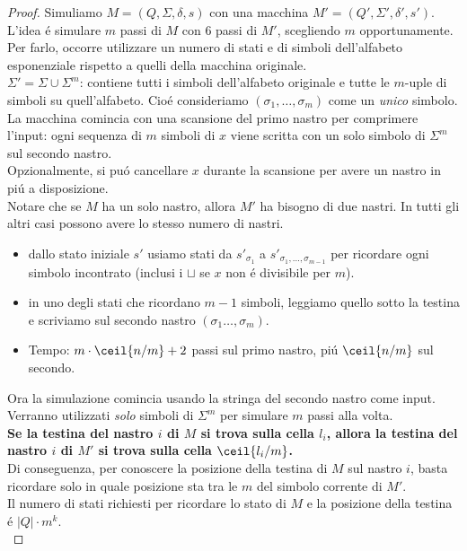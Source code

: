 \begin{proof}
Simuliamo $M=(Q, \Sigma, \delta, s)$ con una macchina $M'=(Q', \Sigma', \delta', s')$. \\
L'idea é simulare $m$ passi di $M$ con $6$ passi di $M'$, scegliendo $m$ opportunamente. \\
Per farlo, occorre utilizzare un numero di stati e di simboli dell'alfabeto esponenziale rispetto a quelli della macchina originale. \\ 
$\Sigma' = \Sigma \cup \Sigma^m$: contiene tutti i simboli dell'alfabeto originale e tutte le $m$-uple di simboli su quell'alfabeto.
Cioé consideriamo $(\sigma_1, \ldots, \sigma_m)$ come un \textit{unico} simbolo. \\

La macchina comincia con una scansione del primo nastro per comprimere l'input: ogni sequenza di $m$ simboli di $x$ viene scritta con un solo simbolo di $\Sigma^m$ sul secondo nastro.\\
Opzionalmente, si puó cancellare $x$ durante la scansione per avere un nastro in piú a disposizione. \\
Notare che se $M$ ha un solo nastro, allora $M'$ ha bisogno di due nastri. In tutti gli altri casi possono avere lo stesso numero di nastri. \\
\begin{itemize}
    \item dallo stato iniziale $s'$ usiamo stati da ${s'}_{\sigma_1}$ a ${s'}_{\sigma_1, \ldots, \sigma_{m-1}}$ per ricordare ogni simbolo incontrato (inclusi i $\sqcup$ se $x$ non é divisibile per $m$).
    \item in uno degli stati che ricordano $m-1$ simboli, leggiamo quello sotto la testina e scriviamo sul secondo nastro $(\sigma_1 \ldots, \sigma_m)$.
    \item Tempo: $m \cdot \ceil{n/m} + 2$  passi sul primo nastro, piú $\ceil{n/m}$ sul secondo.
\end{itemize}

Ora la simulazione comincia usando la stringa del secondo nastro come input. \\
Verranno utilizzati \textit{solo} simboli di $\Sigma^m$ per simulare $m$ passi alla volta. \\

\textbf{Se la testina del nastro $i$ di $M$ si trova sulla cella $l_i$, allora la testina del nastro $i$ di $M'$ si trova sulla cella $\ceil{l_i/m}$.} \\
Di conseguenza, per conoscere la posizione della testina di $M$ sul nastro $i$, basta ricordare solo in quale posizione sta tra le $m$ del simbolo corrente di $M'$. \\
Il numero di stati richiesti per ricordare lo stato di $M$ e la posizione della testina é $|Q| \cdot m^k$. \\


\end{proof}
